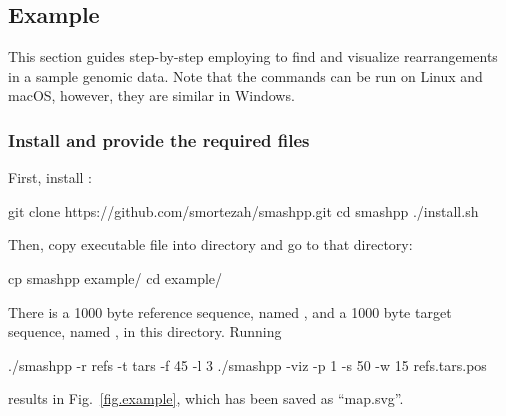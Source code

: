 \documentclass[a4paper,9pt]{extarticle}
\begin{document}
\subsection{Example}
This section guides step-by-step employing \smashpp to find and visualize rearrangements in a sample genomic data. Note that the commands can be run on Linux and macOS, however, they are similar in Windows.

\subsubsection*{Install \smashpp and provide the required files}
First, install \smashpp:
\begin{code}[style=bash]
git clone https://github.com/smortezah/smashpp.git
cd smashpp
./install.sh
\end{code}
Then, copy  executable file into  directory and go to that directory:
\begin{code}[style=bash]
cp smashpp example/
cd example/
\end{code}
There is a 1000 byte reference sequence, named , and a 1000 byte target sequence, named , in this directory. Running
\begin{code}[style=bash]
./smashpp -r refs -t tars -f 45 -l 3
./smashpp -viz -p 1 -s 50 -w 15 refs.tars.pos
\end{code}
results in Fig.~\ref{fig.example}, which has been saved as ``map.svg''.


\clearpage
{}    %
\small
{}


\end{document}
